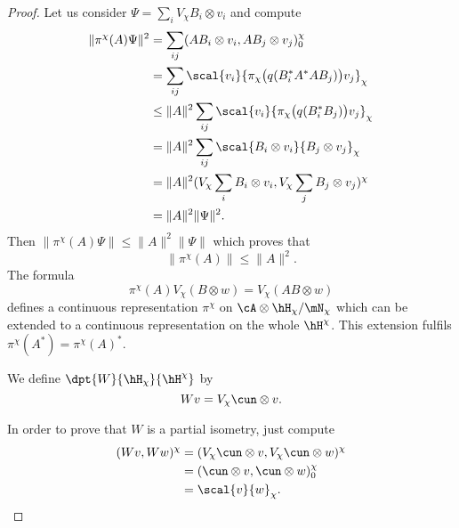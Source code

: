 \begin{proof}
	Let us consider $\Psi=\sum_iV_{\chi}B_i\otimes v_i$ and compute
	\begin{equation}
		\begin{split}
			\| \pi^{\chi}(A)\Psi \|^2&=\sum_{ij}( AB_i\otimes v_i , AB_j\otimes v_j )_0^{\chi}\\
			&=\sum_{ij}\scal{ v_i }{ \pi_{\chi}\big( q(B_i^*A^*AB_j) \big)v_j }_{\chi}\\
			&\leq \| A \|^2\sum_{ij}\scal{ v_i }{ \pi_{\chi}\big( q(B^*_iB_j) \big)v_j }_{\chi}\\
			&=\| A \|^2\sum_{ij}\scal{ B_i\otimes v_i }{ B_j\otimes v_j }_{\chi}\\
			&=\| A \|^2( V_{\chi}\sum_i B_i\otimes v_i , V_{\chi}\sum_jB_j\otimes v_j )^{\chi}\\
			&=\| A \|^2\| \Psi \|^2.
		\end{split}
	\end{equation}
	Then $\| \pi^{\chi}(A)\Psi \|\leq \| A \|^2\| \Psi \|$ which proves that
	\begin{equation}
		\| \pi^{\chi}(A) \|\leq\| A \|^2.
	\end{equation}
	The formula
	\begin{equation}
		\pi^{\chi}(A)V_{\chi}(B\otimes w)=V_{\chi}(AB\otimes w)
	\end{equation}
	defines a continuous representation $\pi^{\chi}$ on $\cA\otimes\hH_{\chi}/\mN_{\chi}$ which can be extended to a continuous representation on the whole $\hH^{\chi}$. This extension fulfils $\pi^{\chi}(A^*)=\pi^{\chi}(A)^*$.

	We define $\dpt{ W }{ \hH_{\chi} }{ \hH^{\chi} }$ by
	\begin{equation}
		Wv=V_{\chi}\cun\otimes v.
	\end{equation}


	In order to prove that $W$ is a partial isometry, just compute
	\begin{equation}
		\begin{split}
			( Wv , Ww )^{\chi}&=( V_{\chi}\cun\otimes v , V_{\chi}\cun\otimes w )^{\chi}\\
			&=( \cun\otimes v , \cun\otimes w )_0^{\chi}\\
			&=\scal{ v }{ w }_{\chi}.
		\end{split}
	\end{equation}



\end{proof}
